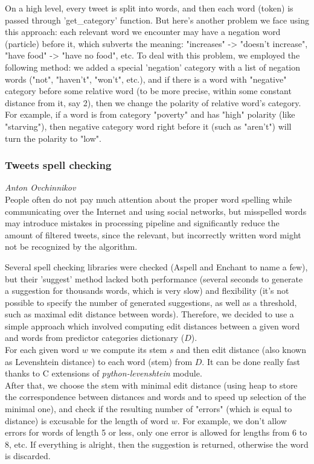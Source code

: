On a high level, every tweet is split into words, and then each word (token) is passed through 'get\_category' function. But here's another problem we face using this approach: each relevant word we encounter may have a negation word (particle) before it, which subverts the meaning: "increases" -> "doesn't increase", "have food" -> "have no food", etc. To deal with this problem, we employed the following method: we added a special 'negation' category with a list of negation words ("not", "haven't", "won't", etc.), and if there is a word with "negative" category before some relative word (to be more precise, within some constant distance from it, say 2), then we change the polarity of relative word's category. For example, if a word is from category "poverty" and has "high" polarity (like "starving"), then negative category word right before it (such as "aren't") will turn the polarity to "low".


\subsubsection*{Tweets spell checking}
\emph{Anton Ovchinnikov} \\
People often do not pay much attention about the proper word spelling while communicating over the Internet and using social networks, but misspelled words may introduce mistakes in processing pipeline and significantly reduce the amount of filtered tweets, since the relevant, but incorrectly written word might not be recognized by the algorithm.

Several spell checking libraries were checked (Aspell and Enchant to name a few), but their 'suggest' method lacked both performance (several seconds to generate a suggestion for thousands words, which is very slow) and flexibility (it's not possible to specify the number of generated suggestions, as well as a threshold, such as maximal edit distance between words). Therefore, we decided to use a simple approach which involved computing edit distances between a given word and words from predictor categories dictionary ($D$).
\\
For each given word $w$ we compute its stem $s$ and then edit distance (also known as Levenshtein distance) to each word (stem) from $D$. It can be done really fast thanks to C extensions of \textit{python-levenshtein} module.
\\
After that, we choose the stem with minimal edit distance (using heap to store the correspondence between distances and words and to speed up selection of the minimal one), and check if the resulting number of "errors" (which is equal to distance) is excusable for the length of word $w$. For example, we don't allow errors for words of length 5 or less, only one error is allowed for lengths from 6 to 8, etc. If everything is alright, then the suggestion is returned, otherwise the word is discarded.

